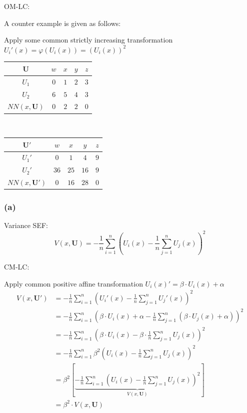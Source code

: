 \documentclass[a4paper]{article}
\begin{document}
OM-LC:

A counter example is given as follows:

Apply some common strictly increasing transformation $U_i'(x)=\varphi(U_i(x))=\left(U_i(x)\right)^2$
\begin{table}[!htbp]
    \centering
    \begin{tabular}{c|cccc|}
        $\mathbf{U}$ & $w$ & $x$ & $y$ & $z$    \\ 
        \hline
        $U_1$        & $0$ & $1$ & $2$ & $3$    \\
        $U_2$        & $6$ & $5$ & $4$ & $3$    \\
        \hline
        $NN(x,\mathbf{U})$ & $0$ & $2$ & $2$ & $0$ \\
    \end{tabular}
    $\qquad\qquad$
    \begin{tabular}{c|cccc|}
        $\mathbf{U'}$ & $w$  & $x$  & $y$  & $z$    \\ 
        \hline
        $U_1'$        & $0$  & $1$  & $4$  & $9$    \\
        $U_2'$        & $36$ & $25$ & $16$ & $9$    \\
        \hline
        $NN(x,\mathbf{U}')$ & $0$ & $16$ & $28$ & $0$ \\
    \end{tabular}
\end{table}

\subsubsection*{(a)}

Variance SEF:
\begin{equation*}
    V(x,\mathbf{U})=-\frac{1}{n}\sum_{i=1}^{n}\left(U_i(x)-\frac{1}{n}\sum_{j=1}^{n}U_j(x) \right)^2
\end{equation*}

CM-LC:

Apply common positive affine transformation $U_i(x)'=\beta\cdot U_i(x)+\alpha$
\begin{align*}
    V(x,\mathbf{U}')&=-\frac{1}{n}\sum_{i=1}^{n}\left(U_i'(x)-\frac{1}{n}\sum_{j=1}^{n}U_j'(x) \right)^2 \\
    &=-\frac{1}{n}\sum_{i=1}^{n}\left(\beta\cdot U_i(x)+\alpha-\frac{1}{n}\sum_{j=1}^{n}(\beta\cdot U_j(x)+\alpha) \right)^2 \\
    &=-\frac{1}{n}\sum_{i=1}^{n}\left(\beta\cdot U_i(x)-\beta\cdot \frac{1}{n}\sum_{j=1}^{n}U_j(x) \right)^2 \\
    &=-\frac{1}{n}\sum_{i=1}^{n}\beta^2\left(U_i(x)-\frac{1}{n}\sum_{j=1}^{n}U_j(x) \right)^2 \\
    &=\beta^2\left[\underbrace{-\frac{1}{n}\sum_{i=1}^{n}\left(U_i(x)-\frac{1}{n}\sum_{j=1}^{n}U_j(x) \right)^2}_{V(x,\mathbf{U})}\right] \\
    &=\beta^2\cdot V(x,\mathbf{U})
\end{align*}
\end{document}

